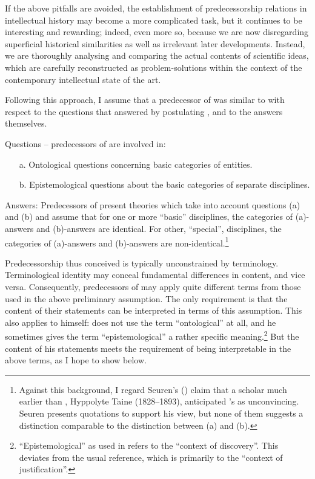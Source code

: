\documentclass[output=paper]{langscibook}
\begin{document}
If the above pitfalls are avoided, the establishment of predecessorship relations in intellectual history may become a more complicated task, but it continues to be interesting and rewarding; indeed, even more so, because we are now disregarding superficial historical similarities as well as irrelevant later developments. Instead, we are thoroughly analysing and comparing the actual contents of scientific ideas, which are carefully reconstructed as problem-solutions within the context of the contemporary intellectual state of the art.\label{q:elffers:probsols}

Following this approach, I assume that a predecessor of  was similar to {\Fodor} with respect to the questions that {\Fodor} answered by postulating , and to the answers themselves.

Questions -- predecessors of  are involved in:

\begin{enumerate}
    \item[a.] Ontological questions concerning basic categories of entities.
    \item[b.] Epistemological questions about the basic categories of separate disciplines.
\end{enumerate}

Answers: Predecessors of  present theories which take into account questions (a) and (b) and assume that for one or more ``basic'' disciplines, the categories of (a)-answers and (b)-answers are identical. For other, ``special'', disciplines, the categories of (a)-answers and (b)-answers are non-identical.\footnote{Against this background, I regard Seuren's (\citeyear[827--832]{Seuren2016}) claim that a scholar much earlier than {\Sapir}, Hyppolyte Taine (1828--1893), anticipated {\Fodor}'s  as unconvincing. Seuren presents quotations to support his view, but none of them suggests a distinction comparable to the distinction between (a) and (b).}

Predecessorship thus conceived is typically unconstrained by terminology. Terminological identity may conceal fundamental differences in content, and vice versa. Consequently, predecessors of  may apply quite different terms from those used in the above preliminary assumption. The only requirement is that the content of their statements can be interpreted in terms of this assumption. This also applies to {\Fodor} himself: \citet{Fodor1974} does not use the term ``ontological'' at all, and he sometimes gives the term ``epistemological'' a rather specific meaning.\footnote{``Epistemological'' as used in \citet[113]{Fodor1974} refers to the ``context of discovery''. This deviates from the usual reference, which is primarily to the ``context of justification''.\label{fn:elffers:6}} But the content of his statements meets the requirement of being interpretable in the above terms, as I hope to show below.
\end{document}
